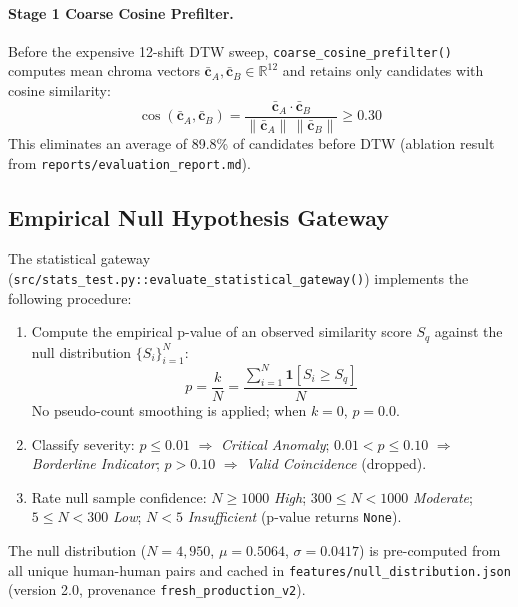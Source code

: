 \documentclass[12pt,a4paper]{article}
\begin{document}
\paragraph{Stage 1 Coarse Cosine Prefilter.}
Before the expensive 12-shift DTW sweep, \texttt{coarse\_cosine\_prefilter()}
computes mean chroma vectors $\bar{\mathbf{c}}_A, \bar{\mathbf{c}}_B \in
\mathbb{R}^{12}$ and retains only candidates with cosine similarity:
\[
  \cos(\bar{\mathbf{c}}_A, \bar{\mathbf{c}}_B)
  = \frac{\bar{\mathbf{c}}_A \cdot \bar{\mathbf{c}}_B}{\|\bar{\mathbf{c}}_A\|\,\|\bar{\mathbf{c}}_B\|}
  \geq 0.30
\]
This eliminates an average of 89.8\% of candidates before DTW
(ablation result from \texttt{reports/evaluation\_report.md}).

\subsection{Empirical Null Hypothesis Gateway}

The statistical gateway (\texttt{src/stats\_test.py::evaluate\_statistical\_gateway()})
implements the following procedure:

\begin{enumerate}[noitemsep]
  \item Compute the empirical p-value of an observed similarity score $S_q$
        against the null distribution $\{S_i\}_{i=1}^{N}$:
        \[
          p = \frac{k}{N} = \frac{\sum_{i=1}^N \mathbf{1}[S_i \geq S_q]}{N}
        \]
        No pseudo-count smoothing is applied; when $k=0$, $p=0.0$.
  \item Classify severity: $p \leq 0.01$ $\Rightarrow$ \emph{Critical Anomaly};
        $0.01 < p \leq 0.10$ $\Rightarrow$ \emph{Borderline Indicator};
        $p > 0.10$ $\Rightarrow$ \emph{Valid Coincidence} (dropped).
  \item Rate null sample confidence: $N \geq 1000$ \emph{High}; $300 \leq N < 1000$
        \emph{Moderate}; $5 \leq N < 300$ \emph{Low}; $N < 5$ \emph{Insufficient}
        (p-value returns \texttt{None}).
\end{enumerate}

The null distribution ($N = 4{,}950$, $\mu = 0.5064$, $\sigma = 0.0417$) is
pre-computed from all unique human-human pairs and cached in
\texttt{features/null\_distribution.json} (version 2.0, provenance
\texttt{fresh\_production\_v2}).
\end{document}
